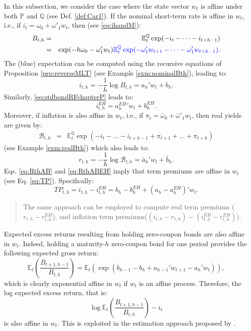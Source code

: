 \documentclass[
  12pt,
]{book}
\theoremstyle{definition}
\theoremstyle{definition}
\theoremstyle{definition}
\theoremstyle{definition}
\theoremstyle{remark}
\begin{document}
In this subsection, we consider the case where the state vector \(w_t\) is affine under both \(\mathbb{P}\) and \(\mathbb{Q}\) (see Def. \ref{def:Car1}). If the nominal short-term rate is affine in \(w_t\), i.e., if \(i_t = \omega_0 + \omega'_1 w_t\), then (see \eqref{eq:ihandM}):
\begin{eqnarray}
B_{t,h} &=& \mathbb{E}^{\mathbb{Q}}_t \exp (-i_{t}-\dots-i_{t+h-1}) \nonumber\\
&=& \exp(-h\omega_0 - \omega'_1 w_t) \color{blue}{\mathbb{E}^{\mathbb{Q}}_t \exp (- \omega'_1 w_{t+1}-\dots- \omega'_1 w_{t+h-1})}.\label{eq:bondpricesCondExp}
\end{eqnarray}
The (blue) expectation can be computed using the recursive equations of Proposition \ref{prp:reverseMLT} (see Example \ref{exm:nominalBth}), leading to:
\begin{equation}
i_{t,h}= -  \frac{1}{h}   \log   B_{t,h} = a_h'w_t + b_h.\label{eq:RthAB}
\end{equation}
Similarly, \eqref{eq:stdbondRFchapterP} leads to:
\begin{equation}
i^{EH}_{t,h} = {a^{EH}_h}'w_t + b^{EH}_h.\label{eq:RthABEH}
\end{equation}
Moreover, if inflation is also affine in \(w_t\), i.e., if \(\pi_{t} = \bar\omega_0 + \bar\omega'_1 w_t\), then real yields are given by:
\begin{eqnarray*}
\mathcal{B}_{t,h} &=& \mathbb{E}^{\mathbb{Q}}_t \exp(-i_{t}-\dots-i_{t+h-1}+\pi_{t+1}+\dots+\pi_{t+h})
\end{eqnarray*}
(see Example \ref{exm:realBth}) which also leads to:
\begin{equation}
r_{t,h} = -  \frac{1}{h}   \log   \mathcal{B}_{t,h} = \bar{a}_h'w_t + \bar{b}_h.\label{eq:RbarthAB}
\end{equation}
Eqs. \eqref{eq:RthAB} and \eqref{eq:RthABEH} imply that term premiums are affine in \(w_t\) (see Eq. \eqref{eq:TP}). Specifically:
\[
TP_{t,h} = i_{t,h} - i^{EH}_{t,h} = b_h - b_h^{EH} + (a_h - a_h^{EH})'w_t.
\]

\begin{quote}
The same approach can be employed to compute real term premiums (\(r_{t,h} - r^{EH}_{t,h}\)), and inflation term premiums(\((i_{t,h}-r_{t,h}) - (i^{EH}_{t,h}-r^{EH}_{t,h})\)).
\end{quote}

Expected excess returns resulting from holding zero-coupon bonds are also affine in \(w_t\). Indeed, holding a maturity-\(h\) zero-coupon bond for one period provides the following expected gross return:
\[
\mathbb{E}_t\left(\frac{B_{t+1,h-1}}{B_{t,h}}\right) = \mathbb{E}_t\left(\exp(b_{h-1} - b_h + a_{h-1}'w_{t+1} - a_h'w_{t})\right),
\]
which is clearly exponential affine in \(w_t\) if \(w_t\) is an affine process. Therefore, the log expected excess return, that is:
\[
\log \mathbb{E}_t\left(\frac{B_{t+1,h-1}}{B_{t,h}}\right) - i_t
\]
is also affine in \(w_t\). This is exploited in the estimation approach proposed by \citet{Adrian_Crump_Moench_2013}.
\end{document}
